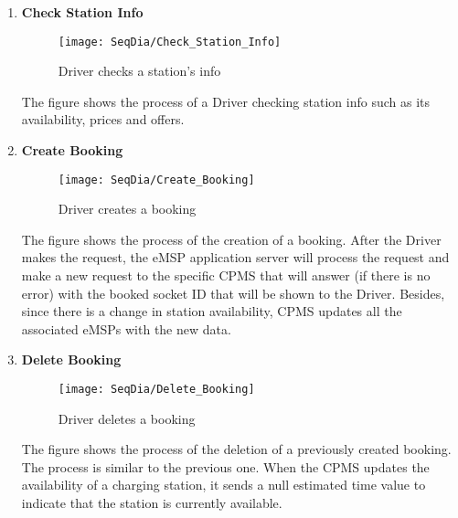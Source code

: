 \begin{enumerate}
        \newpage
        \item \textbf{Check Station Info}
        \begin{figure}[H]
            \begin{center}
            \texttt{[image: SeqDia/Check\_Station\_Info]}
            \caption{Driver checks a station's info}
            \label{fig:CheckStationInfo}
            \end{center}
        \end{figure}
        The figure shows the process of a Driver checking station info such as its availability, prices and offers.
        \newpage
        \item \textbf{Create Booking}
        \begin{figure}[H]
            \begin{center}
            \texttt{[image: SeqDia/Create\_Booking]}
            \caption{Driver creates a booking}
            \label{fig:CreateBooking}
            \end{center}
        \end{figure}
        The figure shows the process of the creation of a booking. After the Driver makes the request, the eMSP application server will process the request and make a new request to the specific CPMS that will answer (if there is no error) with the booked socket ID that will be shown to the Driver. Besides, since there is a change in station availability, CPMS updates all the associated eMSPs with the new data.
        \newpage
        \item \textbf{Delete Booking}
        \begin{figure}[H]
            \begin{center}
            \texttt{[image: SeqDia/Delete\_Booking]}
            \caption{Driver deletes a booking}
            \label{fig:DeleteBooking}
            \end{center}
        \end{figure}
        The figure shows the process of the deletion of a previously created booking. The process is similar to the previous one. When the CPMS updates the availability of a charging station, it sends a null estimated time value to indicate that the station is currently available.

\end{enumerate}
